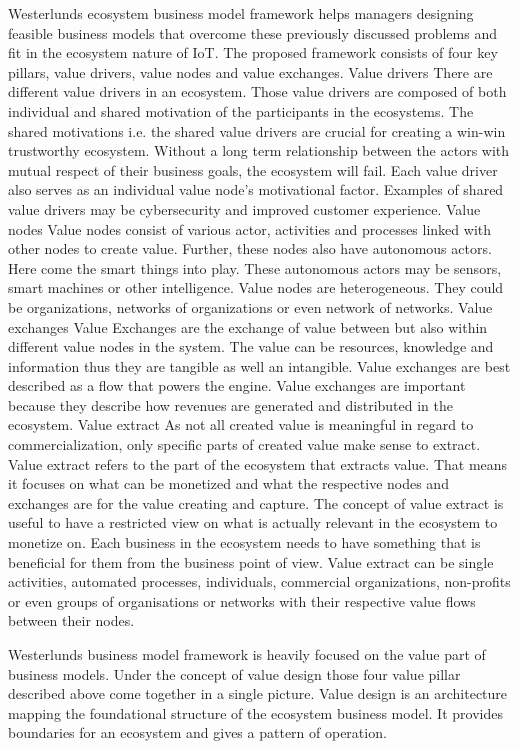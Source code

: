 Westerlunds ecosystem business model framework helps managers designing feasible business models that overcome these previously discussed problems and fit in the ecosystem nature of IoT. 
The proposed framework consists of four key pillars, value drivers, value nodes and value exchanges.
Value drivers
There are different value drivers in an ecosystem. Those value drivers are composed of both individual and shared motivation of the participants in the ecosystems. The shared motivations i.e. the shared value drivers are crucial for creating a win-win trustworthy ecosystem. Without a long term relationship between the actors with mutual respect of their business goals, the ecosystem will fail. Each value driver also serves as an individual value node's motivational factor. Examples of shared value drivers may be cybersecurity and improved customer experience.
Value nodes
Value nodes consist of various actor, activities and processes linked with other nodes to create value. Further, these nodes also have autonomous actors. Here come the smart things into play. These autonomous actors may be sensors, smart machines or other intelligence. Value nodes are heterogeneous. They could be organizations, networks of organizations or even network of networks.
Value exchanges
Value Exchanges are the exchange of value between but also within different value nodes in the system. The value can be resources, knowledge and information thus they are tangible as well an intangible. Value exchanges are best described as a flow that powers the engine. Value exchanges are important because they describe how revenues are generated and distributed in the ecosystem.
Value extract
As not all created value is meaningful in regard to commercialization, only specific parts of created value make sense to extract. Value extract refers to the part of the ecosystem that extracts value. That means it focuses on what can be monetized and what the respective nodes and exchanges are for the value creating and capture. The concept of value extract is useful to have a restricted view on what is actually relevant in the ecosystem to monetize on. Each business in the ecosystem needs to have something that is beneficial for them from the business point of view. Value extract can be single activities, automated processes, individuals, commercial organizations, non-profits or even groups of organisations or networks with their respective value flows between their nodes.

Westerlunds business model framework is heavily focused on the value part of business models. Under the concept of value design those four value pillar described above come together in a single picture. Value design is an architecture mapping the foundational structure of the ecosystem business model. It provides boundaries for an ecosystem and gives a pattern of operation.


